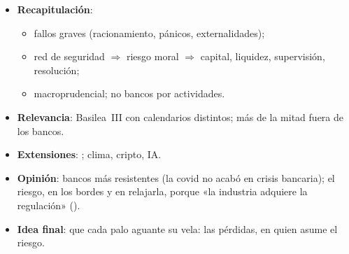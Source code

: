 \documentclass{article}
\begin{document}
\begin{columnas}
\begin{itemize}
\item \textbf{Recapitulación}:
  \begin{itemize}
  \item fallos graves (racionamiento, pánicos, externalidades);
  \item red de seguridad $\Rightarrow$ riesgo moral $\Rightarrow$ capital, liquidez, supervisión, resolución;
  \item macroprudencial; no bancos por actividades.
  \end{itemize}
\item \textbf{Relevancia}: Basilea~III con calendarios distintos; más de la mitad fuera de los bancos.
\item \textbf{Extensiones}:    ; clima, cripto, IA.
\item \textbf{Opinión}: bancos más resistentes (la covid no acabó en crisis bancaria); el riesgo, en los bordes y en relajarla, porque «la industria adquiere la regulación» ().
\item \textbf{Idea final}: que cada palo aguante su vela: las pérdidas, en quien asume el riesgo.
\end{itemize}


\end{columnas}
\end{document}
